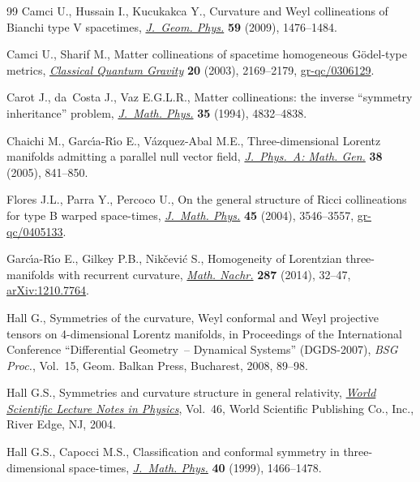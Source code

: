 \documentclass[10pt,a4paper]{amsart}
\numberwithin{equation}{section}
\begin{document}
\begin{thebibliography}{99}
Camci U., Hussain I., Kucukakca Y., Curvature and {W}eyl collineations of
 {B}ianchi type {V} spacetimes, \href{http://dx.doi.org/10.1016/j.geomphys.2009.07.008}{\textit{J.~Geom. Phys.}} \textbf{59} (2009),
 1476--1484.

Camci U., Sharif M., Matter collineations of spacetime homogeneous
 {G}\"odel-type metrics, \href{http://dx.doi.org/10.1088/0264-9381/20/11/316}{\textit{Classical Quantum Gravity}} \textbf{20}
 (2003), 2169--2179, \href{http://arxiv.org/abs/gr-qc/0306129}{gr-qc/0306129}.

Carot J., da~Costa J., Vaz E.G.L.R., Matter collineations: the inverse
 ``symmetry inheritance'' problem, \href{http://dx.doi.org/10.1063/1.530816}{\textit{J.~Math. Phys.}} \textbf{35} (1994),
 4832--4838.

Chaichi M., Garc{\'{\i}}a-R{\'{\i}}o E., V{\'a}zquez-Abal M.E.,
 Three-dimensional {L}orentz manifolds admitting a parallel null vector f\/ield,
 \href{http://dx.doi.org/10.1088/0305-4470/38/4/005}{\textit{J.~Phys.~A: Math. Gen.}} \textbf{38} (2005), 841--850.

Flores J.L., Parra Y., Percoco U., On the general structure of {R}icci
 collineations for type {B} warped space-times, \href{http://dx.doi.org/10.1063/1.1775875}{\textit{J.~Math. Phys.}}
 \textbf{45} (2004), 3546--3557, \href{http://arxiv.org/abs/gr-qc/0405133}{gr-qc/0405133}.

Garc{\'{\i}}a-R{\'{\i}}o E., Gilkey P.B., Nik{\v{c}}evi{\'c} S., Homogeneity of
 {L}orentzian three-manifolds with recurrent curvature, \href{http://dx.doi.org/10.1002/mana.201200302}{\textit{Math. Nachr.}}
 \textbf{287} (2014), 32--47, \href{http://arxiv.org/abs/1210.7764}{arXiv:1210.7764}.

Hall G., Symmetries of the curvature, {W}eyl conformal and {W}eyl projective
 tensors on 4-dimensional {L}orentz manifolds, in Proceedings of the
 {I}nternational {C}onference ``{D}if\/ferential {G}eometry~-- {D}ynamical
 {S}ystems'' ({DGDS}-2007), \textit{BSG Proc.}, Vol.~15, Geom. Balkan Press,
 Bucharest, 2008, 89--98.

Hall G.S., Symmetries and curvature structure in general relativity,
 \href{http://dx.doi.org/10.1142/1729}{\textit{World Scientific Lecture Notes in Physics}}, Vol.~46, World Scientif\/ic
 Publishing Co., Inc., River Edge, NJ, 2004.

Hall G.S., Capocci M.S., Classif\/ication and conformal symmetry in
 three-dimensional space-times, \href{http://dx.doi.org/10.1063/1.532815}{\textit{J.~Math. Phys.}} \textbf{40} (1999),
 1466--1478.


\end{thebibliography}
\end{document}
